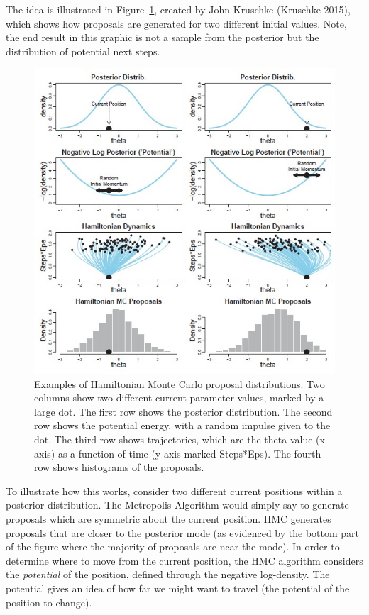 \documentclass[
  letterpaper,
  DIV=11,
  numbers=noendperiod]{scrreprt}
\theoremstyle{definition}
\theoremstyle{definition}
\theoremstyle{plain}
\theoremstyle{remark}
\begin{document}
The idea is illustrated in Figure~\ref{fig-mcmc-p1}, created by John
Kruschke (Kruschke 2015), which shows how proposals are generated for
two different initial values. Note, the end result in this graphic is
not a sample from the posterior but the distribution of potential next
steps.

\begin{figure}

{\centering \includegraphics{images/Kruschke-Fig1.jpg}

}

\caption{\label{fig-mcmc-p1}Examples of Hamiltonian Monte Carlo proposal
distributions. Two columns show two different current parameter values,
marked by a large dot. The first row shows the posterior distribution.
The second row shows the potential energy, with a random impulse given
to the dot. The third row shows trajectories, which are the theta value
(x-axis) as a function of time (y-axis marked Steps*Eps). The fourth row
shows histograms of the proposals.}

\end{figure}

To illustrate how this works, consider two different current positions
within a posterior distribution. The Metropolis Algorithm would simply
say to generate proposals which are symmetric about the current
position. HMC generates proposals that are closer to the posterior mode
(as evidenced by the bottom part of the figure where the majority of
proposals are near the mode). In order to determine where to move from
the current position, the HMC algorithm considers the \emph{potential}
of the position, defined through the negative log-density. The potential
gives an idea of how far we might want to travel (the potential of the
position to change).
\end{document}
